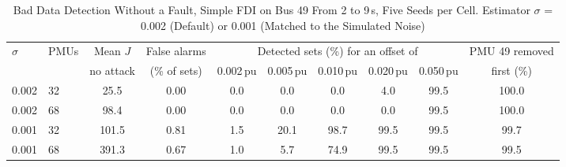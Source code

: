 \begin{table}[t]
\caption{Bad Data Detection Without a Fault, Simple FDI on Bus 49 From 2 to 9\,s, Five Seeds per Cell. Estimator $\sigma$ = 0.002 (Default) or 0.001 (Matched to the Simulated Noise)}
\label{tab:detection}
\centering
\footnotesize
\setlength{\tabcolsep}{4pt}
\begin{tabular}{@{}llcccccccc@{}}
\toprule
$\sigma$ & PMUs & Mean $J$ & False alarms & \multicolumn{5}{c}{Detected sets (\%) for an offset of} & PMU 49 removed \\
\cmidrule(lr){5-9}
 & & no attack & (\% of sets) & 0.002\,pu & 0.005\,pu & 0.010\,pu & 0.020\,pu & 0.050\,pu & first (\%) \\
\midrule
0.002 & 32 & 25.5 & 0.00 & 0.0 & 0.0 & 0.0 & 4.0 & 99.5 & 100.0 \\
0.002 & 68 & 98.4 & 0.00 & 0.0 & 0.0 & 0.0 & 0.0 & 99.5 & 100.0 \\
0.001 & 32 & 101.5 & 0.81 & 1.5 & 20.1 & 98.7 & 99.5 & 99.5 & 99.7 \\
0.001 & 68 & 391.3 & 0.67 & 1.0 & 5.7 & 74.9 & 99.5 & 99.5 & 99.5 \\
\bottomrule
\end{tabular}
\end{table}
